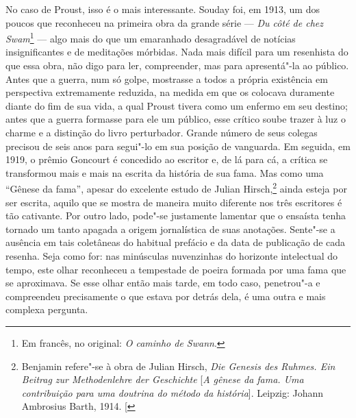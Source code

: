 No caso de Proust, isso é o mais interessante. Souday foi, em 1913, um
dos poucos que reconheceu na primeira obra da grande série --- \emph{Du côté de chez Swam}\footnote{Em francês, no original: \emph{O
caminho de Swann}.} --- algo mais do que um emaranhado desagradável de
notícias insignificantes e de meditações mórbidas. Nada mais difícil
para um resenhista do que essa obra, não digo para ler, compreender, mas
para apresentá"-la ao público. Antes que a guerra, num só golpe,
mostrasse a todos a própria existência em perspectiva extremamente
reduzida, na medida em que os colocava duramente diante do fim de sua
vida, a qual Proust tivera como um enfermo em seu destino; antes que a
guerra formasse para ele um público, esse crítico soube trazer à luz o
charme e a distinção do livro perturbador. Grande número de seus colegas
precisou de seis anos para segui"-lo em sua posição de vanguarda. Em
seguida, em 1919, o prêmio Goncourt é concedido ao escritor e, de lá
para cá, a crítica se transformou mais e mais na escrita da história de
sua fama. Mas como uma ``Gênese da fama'', apesar do excelente estudo de
Julian Hirsch,\footnote{Benjamin refere"-se à obra de Julian Hirsch,
  \emph{Die Genesis des Ruhmes. Ein Beitrag zur Methodenlehre der
  Geschichte} {[}\emph{A gênese da fama. Uma contribuição para uma
  doutrina do método da história}{]}. Leipzig: Johann Ambrosius Barth,
  1914. {[}\versal{N. E.}{]}} ainda esteja por ser escrita, aquilo que se mostra
de maneira muito diferente nos três escritores é tão cativante. Por
outro lado, pode"-se justamente lamentar que o ensaísta tenha tornado um
tanto apagada a origem jornalística de suas anotações. Sente"-se a
ausência em tais coletâneas do habitual prefácio e da data de publicação
de cada resenha. Seja como for: nas minúsculas nuvenzinhas do horizonte
intelectual do tempo, este olhar reconheceu a tempestade de poeira
formada por uma fama que se aproximava. Se esse olhar então mais tarde,
em todo caso, penetrou"-a e compreendeu precisamente o que estava por
detrás dela, é uma outra e mais complexa pergunta.

